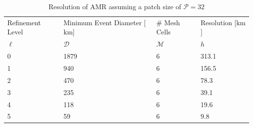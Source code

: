 \documentclass[twoside]{bsu-ms}
\begin{document}
\begin{table}[!htbp]
    \vspace{-3pt}
	\caption{Resolution of AMR assuming a patch size of $\mathcal{P}=32$}
	\label{tbl:2.1}
	\begin{center}
			\setlength{\tabcolsep}{3pt}
			\begin{tabular}{l|l|l|l}
					\hline
					    Refinement Level&Minimum Event Diameter [$\mathrm{km}$]&\# Mesh Cells&Resolution [$\mathrm{km}$]\\
					$\ell$&$\mathcal{D}$&$\mathcal{M}$&$h$\\
					 \hline \hline
					0 & 1879 & 6 &  313.1\\
					\hline
					1 & 940 & 6 & 156.5\\
					\hline
					2 & 470 & 6 & 78.3\\
					\hline
					3 & 235 & 6 & 39.1\\
					\hline
					4 & 118 & 6 & 19.6\\ 
					\hline
					5 & 59 & 6 & 9.8\\
					 \hline
				\end{tabular}
		\end{center}
\end{table}
\end{document}
